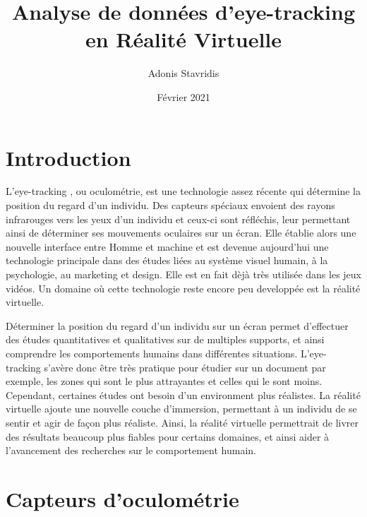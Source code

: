\documentclass[12pt]{article}
\title{\textbf{Analyse de données d’eye-tracking en Réalité Virtuelle}}
\author{\Large{Adonis Stavridis}}
\date{Février 2021}
\begin{document}

\maketitle
\tableofcontents
\pagebreak


\section{Introduction}
L'eye-tracking \cite{wiki:eye_tracking}, ou oculométrie, est une technologie
assez récente qui détermine la position du regard d'un individu. Des capteurs
spéciaux envoient des rayons infrarouges vers les yeux d'un individu et ceux-ci
sont réfléchis, leur permettant ainsi de déterminer ses mouvements oculaires
sur un écran. Elle établie alors une nouvelle interface entre Homme et machine
et est devenue aujourd'hui une technologie principale dans des études liées au
système visuel humain, à la psychologie, au marketing et design. Elle est en
fait dèjà très utilisée dans les jeux vidéos. Un domaine où cette technologie
reste encore peu developpée est la réalité virtuelle.

\bigskip
Déterminer la position du regard d'un individu sur un écran permet d'effectuer
des études quantitatives et qualitatives sur de multiples supports, et ainsi
comprendre les comportements humains dans différentes situations. L'eye-tracking
s'avère donc être très pratique pour étudier sur un document par exemple, les
zones qui sont le plus attrayantes et celles qui le sont moins. Cependant,
certaines études ont besoin d'un environment plus réalistes. La réalité
virtuelle ajoute une nouvelle couche d'immersion, permettant à un individu de
se sentir et agir de façon plus réaliste. Ainsi, la réalité virtuelle
permettrait de livrer des résultats beaucoup plus fiables pour certains
domaines, et ainsi aider à l'avancement des recherches sur le comportement
humain.


\section{Capteurs d'oculométrie}
\end{document}

